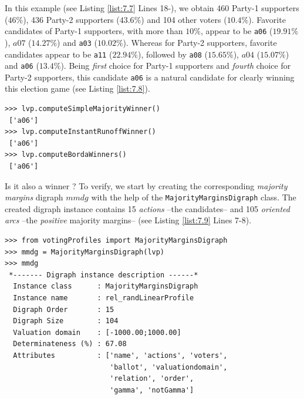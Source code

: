 In this example (see Listing \ref{list:7.7} Lines 18-), we obtain 460 Party-1 supporters ($46\%$), 436 Party-2 supporters ($43.6\%$) and 104 other voters ($10.4\%$). Favorite candidates of Party-1 supporters, with more than $10\%$, appear to be \texttt{a06} ($19.91\%$), $a07$ ($14.27\%$) and \texttt{a03} ($10.02\%$). Whereas for Party-2 supporters, favorite candidates appear to be \texttt{a11} ($22.94\%$), followed by \texttt{a08} ($15.65\%$), $a04$ ($15.07\%$) and \texttt{a06} ($13.4\%$). Being \emph{first} choice for Party-1 supporters and \emph{fourth} choice for Party-2 supporters, this candidate \texttt{a06} is a natural candidate for clearly winning this election game (see Listing \ref{list:7.8}).
\begin{lstlisting}[caption={The uninominal and \emph{Borda} election winner},label=list:7.8]
>>> lvp.computeSimpleMajorityWinner()
 ['a06']
>>> lvp.computeInstantRunoffWinner()
 ['a06']  
>>> lvp.computeBordaWinners()
 ['a06']
\end{lstlisting}

Is it also a \Condorcet winner ? To verify, we start by creating the corresponding \emph{majority margins} digraph $mmdg$ with the help of the \texttt{MajorityMarginsDigraph} class. The created digraph instance contains 15 \emph{actions} --the candidates-- and 105 \emph{oriented arcs} --the \emph{positive} majority margins-- (see Listing \ref{list:7.9} Lines 7-8).
\begin{lstlisting}[caption={A majority margins digraph constructed from a linear voting profile},label=list:7.9]
>>> from votingProfiles import MajorityMarginsDigraph
>>> mmdg = MajorityMarginsDigraph(lvp)
>>> mmdg
 *------- Digraph instance description ------*
  Instance class      : MajorityMarginsDigraph
  Instance name       : rel_randLinearProfile
  Digraph Order       : 15
  Digraph Size        : 104
  Valuation domain    : [-1000.00;1000.00]
  Determinateness (%) : 67.08
  Attributes          : ['name', 'actions', 'voters',
                         'ballot', 'valuationdomain',
                         'relation', 'order',
                         'gamma', 'notGamma']
\end{lstlisting}


